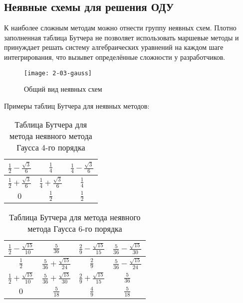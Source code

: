 \subsection{Неявные схемы для решения ОДУ}

К наиболее сложным методам можно отнести группу неявных схем. Плотно заполненная таблица Бутчера не позволяет использовать маршевые
методы и принуждает решать систему алгебраических уравнений на каждом шаге интегрирования, что вызывет определённые сложности у
разработчиков.

\begin{figure}
    \texttt{[image: 2-03-gauss]}
    \caption{Общий вид неявных схем}
    \label{fig:Gauss}
\end{figure}

Примеры таблиц Бутчера для неявных методов:

\begin{table}    
    \caption{Таблица Бутчера для метода неявного метода Гаусса 4-го порядка}
    \begin{tabular}{|c|c|c|}
    \hline
    $\frac{1}{2} - \frac{\sqrt{3}}{6}$ & $\frac{1}{4}$ & $\frac{1}{4} - \frac{\sqrt{3}}{6}$\\
    \hline
    $\frac{1}{2} + \frac{\sqrt{3}}{6}$ & $\frac{1}{4} + \frac{\sqrt{3}}{6}$ & $\frac{1}{4}$\\
    \hline
    $0$ & \cellcolor{lightgray} $\frac{1}{2}$ & \cellcolor{lightgray} $\frac{1}{2}$\\
    \hline
    \end{tabular}
    \label{tab:Gauss4}
\end{table}

\begin{table}    
    \caption{Таблица Бутчера для метода неявного метода Гаусса 6-го порядка}
    \begin{tabular}{|c|c|c|c|}
    \hline
    $\frac{1}{2} - \frac{\sqrt{15}}{10}$ & $\frac{5}{36}$ & $\frac{2}{9} - \frac{\sqrt{15}}{15}$ & $\frac{5}{36} - \frac{\sqrt{15}}{30}$\\
    \hline
    $\frac{1}{2}$ & $\frac{5}{36} + \frac{\sqrt{15}}{24}$ & $\frac{2}{9}$ & $\frac{5}{36} - \frac{\sqrt{15}}{24}$\\
    \hline
    $\frac{1}{2} + \frac{\sqrt{15}}{10}$ & $\frac{5}{36} + \frac{\sqrt{15}}{30}$ & $\frac{2}{9} + \frac{\sqrt{15}}{15}$ & $\frac{5}{36}$\\
    \hline
    $0$ & \cellcolor{lightgray} $\frac{5}{18}$ & \cellcolor{lightgray} $\frac{4}{9}$ & \cellcolor{lightgray} $\frac{5}{18}$\\
    \hline
    \end{tabular}
    \label{tab:Gauss6}
\end{table}

